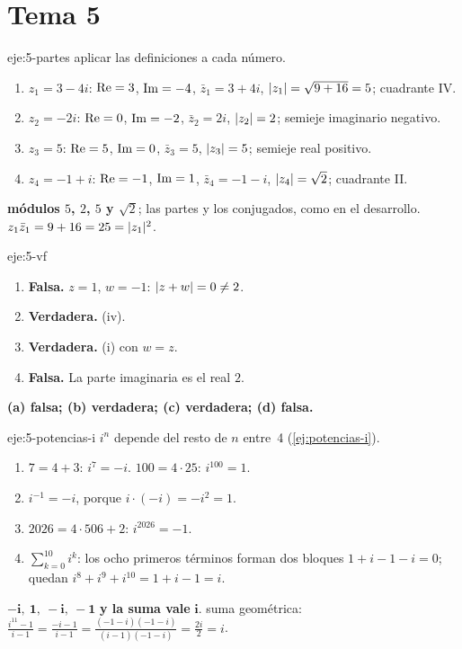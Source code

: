 \section{Tema 5}

\begin{solucion}{eje:5-partes}
\planteamiento aplicar las definiciones a cada número.
\pasos
\begin{enumerate}[label=\arabic*.]
  \item $z_1=3-4i$: $\operatorname{Re}=3$, $\operatorname{Im}=-4$, $\bar z_1=3+4i$, $\lvert z_1\rvert=\sqrt{9+16}=5$; cuadrante IV.
  \item $z_2=-2i$: $\operatorname{Re}=0$, $\operatorname{Im}=-2$, $\bar z_2=2i$, $\lvert z_2\rvert=2$; semieje imaginario negativo.
  \item $z_3=5$: $\operatorname{Re}=5$, $\operatorname{Im}=0$, $\bar z_3=5$, $\lvert z_3\rvert=5$; semieje real positivo.
  \item $z_4=-1+i$: $\operatorname{Re}=-1$, $\operatorname{Im}=1$, $\bar z_4=-1-i$, $\lvert z_4\rvert=\sqrt2$; cuadrante II.
\end{enumerate}
\resultado \textbf{módulos $5$, $2$, $5$ y $\sqrt2$}; las partes y los conjugados, como en el desarrollo.
\comprobacion $z_1\bar z_1=9+16=25=\lvert z_1\rvert^{2}$.
\end{solucion}

\begin{solucion}{eje:5-vf}
\pasos
\begin{enumerate}[label=(\alph*)]
  \item \textbf{Falsa.} $z=1$, $w=-1$: $\lvert z+w\rvert=0\ne2$.
  \item \textbf{Verdadera.} (iv).
  \item \textbf{Verdadera.} (i) con $w=z$.
  \item \textbf{Falsa.} La parte imaginaria es el real $2$.
\end{enumerate}
\resultado \textbf{(a) falsa; (b) verdadera; (c) verdadera; (d) falsa.}
\end{solucion}

\begin{solucion}{eje:5-potencias-i}
\planteamiento $i^{n}$ depende del resto de $n$ entre~4 (\cref{ej:potencias-i}).
\pasos
\begin{enumerate}[label=\arabic*.]
  \item $7=4+3$: $i^{7}=-i$. \quad $100=4\cdot25$: $i^{100}=1$.
  \item $i^{-1}=-i$, porque $i\cdot(-i)=-i^{2}=1$.
  \item $2026=4\cdot506+2$: $i^{2026}=-1$.
  \item $\sum_{k=0}^{10}i^{k}$: los ocho primeros términos forman dos bloques $1+i-1-i=0$; quedan $i^{8}+i^{9}+i^{10}=1+i-1=i$.
\end{enumerate}
\resultado $\mathbf{-i,\ 1,\ -i,\ -1}$ \textbf{y la suma vale} $\mathbf{i}$.
\comprobacion suma geométrica: $\frac{i^{11}-1}{i-1}=\frac{-i-1}{i-1}=\frac{(-1-i)(-1-i)}{(i-1)(-1-i)}=\frac{2i}{2}=i$.
\end{solucion}

